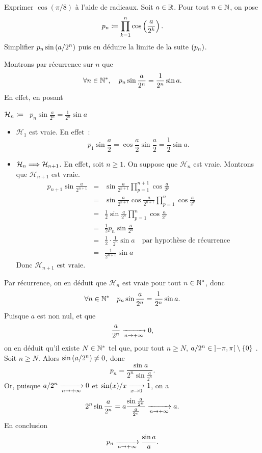 \documentclass{magnolia}
\begin{document}
\begin{exos}
\exo Exprimer $\cos(\pi/8)$ à l'aide de radicaux.
\exo Soit $a\in\mathbb{R}$. Pour tout $n\in\mathbb{N}$, on pose
  \[p_n\coloneqq\prod_{k=1}^n \cos\left(\frac{a}{2^k}\right).\]
  Simplifier $p_n \sin\left(a/2^n\right)$ puis en déduire la limite de la suite $\left(p_n\right)$.
  \begin{sol}
Montrons par récurrence sur $n$ que
  \[\forall n\in{\mathbb{N}^*} ,\quad p_n\sin\frac{a}{2^n}=\frac{1}{2^n}\sin a.\]
  En effet, en posant
  \begin{center}
  $\mathcal{H}_n \coloneqq$ \flqq\ $p_n\sin\frac{a}{2^n}=\frac{1}{2^n}\sin a$ \frqq
  \end{center}
  \begin{itemize}
  \item $\mathcal{H}_1$ est vraie. En effet~:
    \[p_1\sin\frac{a}{2}=\cos\frac{a}{2}\sin\frac{a}{2}=\frac{1}{2}\sin a.\]
  \item $\mathcal{H}_n \Longrightarrow \mathcal{H}_{n+1}$. En effet, soit $n\geq 1$.
    On suppose que $\mathcal{H}_n$ est vraie. Montrons que $\mathcal{H}_{n+1}$
    est vraie.
    \begin{eqnarray*}
    p_{n+1}\sin\frac{a}{2^{n+1}}
    &=& \sin\frac{a}{2^{n+1}} \prod_{p=1}^{n+1} \cos\frac{a}{2^p}\\
    &=& \sin\frac{a}{2^{n+1}} \cos\frac{a}{2^{n+1}}
        \prod_{p=1}^n \cos\frac{a}{2^p}\\
    &=& \frac{1}{2} \sin\frac{a}{2^n} \prod_{p=1}^n \cos\frac{a}{2^p}\\
    &=& \frac{1}{2} p_n \sin\frac{a}{2^n}\\
    &=& \frac{1}{2}\cdot \frac{1}{2^n} \sin a
        \quad\text{par hypothèse de récurrence}\\
    &=& \frac{1}{2^{n+1}} \sin a
    \end{eqnarray*}
    Donc $\mathcal{H}_{n+1}$ est vraie.
  \end{itemize}
  Par récurrence, on en déduit que $\mathcal{H}_{n}$ est vraie pour tout
  $n\in{\mathbb{N}^*}$, donc
  \[\forall n\in{\mathbb{N}^*} \quad p_n\sin\frac{a}{2^n}=\frac{1}{2^n}\sin a.\]
  Puisque $a$ est non nul, et que
  \[\frac{a}{2^n}\xrightarrow[n\rightarrow +\infty]{}0,\]
  on en déduit qu'il existe $N\in{\mathbb{N}^*}$ tel que, pour tout $n\geq N$, $a/2^n\in\left]-\pi,\pi\right[\setminus\left\{0\right\}$ . Soit $n\geq N$. Alors $\sin\left(a/2^n\right)\neq 0$, donc
  \[p_n=\frac{\sin a}{2^n\sin\frac{a}{2^n}}.\]
  Or, puisque $a/2^n \xrightarrow[n\rightarrow +\infty]{} 0$ et $\sin(x)/x \xrightarrow[x\rightarrow 0]{} 1$,
  on a
  \[2^n\sin\frac{a}{2^n}=a\frac{\sin\frac{a}{2^n}}{\frac{a}{2^n}}
    \xrightarrow[n\rightarrow +\infty]{} a.\]
  En conclusion
  \[p_n\xrightarrow[n\rightarrow +\infty]{} \frac{\sin a}{a}.\]
  \end{sol}
\end{exos}
\end{document}
